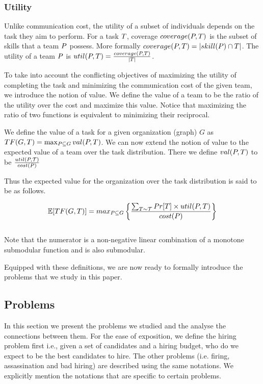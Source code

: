 \subsubsection{Utility}
Unlike communication cost, the utility of a subset of individuals depends on the task they aim to perform. 
For a task $T$, coverage $coverage(P,T)$ is the subset of skills that a team $P$ possess.
More formally $coverage(P,T) = |skill(P) \cap T|$.
The utility of a team $ P $ is ${util}(P,T) = \frac{coverage(P, T)}{|T|}$.

To take into account the conflicting objectives of maximizing the utility of completing the task and minimizing the communication cost of the given team, we introduce the notion of value. We define the value of a team to be the ratio of the utility over the cost and maximize this value. Notice that maximizing the ratio of two functions is equivalent to minimizing their reciprocal.  

We define the value of a task for a given organization (graph) $G$ as $TF(G,T) = \max_{P \subseteq G}{val(P,T)}$. We can now extend the notion of value to the expected value of a team over the task distribution. There we define $val(P,T)$ to be $\frac{{util}(P,\mathcal{T})}{cost(P)} $

Thus the expected value for the organization over the task distribution is said to be as follows.

$$\mathbb{E}[TF(G,T)] = max_{P \subseteq G} \left\{ \frac{\sum_{T \sim \mathcal{T} } Pr[T] \times {util}(P, T)} {cost(P)} \right\} $$ \\

Note that the numerator is a non-negative linear combination of a monotone submodular function and is also submodular.

Equipped with these definitions, we are now ready to formally introduce the problems that we study in this paper.

\subsection{Problems}

In this section we present the problems we studied and the analyse the connections between them. For the ease of exposition, we define the hiring problem first i.e., given a set of candidates and a hiring budget, who do we expect to be the best candidates to hire. The other problems (i.e. firing, assassination and bad hiring) are described using the same notations. We explicitly mention the notations that are specific to certain problems.

